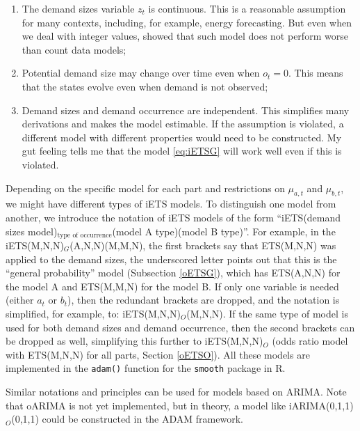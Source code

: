 \documentclass[]{book}
\providecommand{\tightlist}{%
  \setlength{\itemsep}{0pt}\setlength{\parskip}{0pt}}
\theoremstyle{definition}
\theoremstyle{definition}
\theoremstyle{definition}
\theoremstyle{definition}
\theoremstyle{remark}
\begin{document}
\begin{enumerate}
\def\labelenumi{\arabic{enumi}.}
\tightlist
\item
  The demand sizes variable \(z_t\) is continuous. This is a reasonable assumption for many contexts, including, for example, energy forecasting. But even when we deal with integer values, \citet{Svetunkov2019a} showed that such model does not perform worse than count data models;
\item
  Potential demand size may change over time even when \(o_t=0\). This means that the states evolve even when demand is not observed;
\item
  Demand sizes and demand occurrence are independent. This simplifies many derivations and makes the model estimable. If the assumption is violated, a different model with different properties would need to be constructed. My gut feeling tells me that the model \eqref{eq:iETSG} will work well even if this is violated.
\end{enumerate}

Depending on the specific model for each part and restrictions on \(\mu_{a,t}\) and \(\mu_{b,t}\), we might have different types of iETS models. To distinguish one model from another, we introduce the notation of iETS models of the form ``iETS(demand sizes model)\(_\text{type of occurrence}\)(model A type)(model B type)''. For example, in the iETS(M,N,N)\(_G\)(A,N,N)(M,M,N), the first brackets say that ETS(M,N,N) was applied to the demand sizes, the underscored letter points out that this is the ``general probability'' model (Subsection \ref{oETSG}), which has ETS(A,N,N) for the model A and ETS(M,M,N) for the model B. If only one variable is needed (either \(a_t\) or \(b_t\)), then the redundant brackets are dropped, and the notation is simplified, for example, to: iETS(M,N,N)\(_O\)(M,N,N). If the same type of model is used for both demand sizes and demand occurrence, then the second brackets can be dropped as well, simplifying this further to iETS(M,N,N)\(_O\) (odds ratio model with ETS(M,N,N) for all parts, Section \ref{oETSO}). All these models are implemented in the \texttt{adam()} function for the \texttt{smooth} package in R.

Similar notations and principles can be used for models based on ARIMA. Note that oARIMA is not yet implemented, but in theory, a model like iARIMA(0,1,1)\(_O\)(0,1,1) could be constructed in the ADAM framework.
\end{document}
